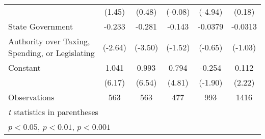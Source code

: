 {\begin{tabular}{l*{5}{c}}
                    &      (1.45)         &      (0.48)         &     (-0.08)         &     (-4.94)         &      (0.18)         \\
[1em]
State Government    &      -0.233\sym{**} &      -0.281\sym{***}&      -0.143         &     -0.0379         &     -0.0313         \\
Authority over Taxing, Spending, or Legislating&     (-2.64)         &     (-3.50)         &     (-1.52)         &     (-0.65)         &     (-1.03)         \\
[1em]
Constant            &       1.041\sym{***}&       0.993\sym{***}&       0.794\sym{***}&      -0.254         &       0.112\sym{*}  \\
                    &      (6.17)         &      (6.54)         &      (4.81)         &     (-1.90)         &      (2.22)         \\
\hline
Observations        &         563         &         563         &         477         &         993         &        1416         \\
\hline\hline
\multicolumn{6}{l}{\footnotesize \textit{t} statistics in parentheses}\\
\multicolumn{6}{l}{\footnotesize \sym{*} \(p<0.05\), \sym{**} \(p<0.01\), \sym{***} \(p<0.001\)}\\
\end{tabular}
}

